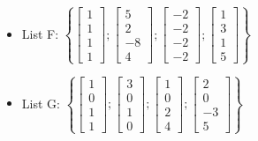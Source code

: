 \begin{itemize}
\item 
List F:
$\left\{\left[ \begin{array}{c} 1 \\ 1 \\ 1 \\ 1  \end{array} \right] ;
\left[ \begin{array}{c} 5 \\ 2 \\ -8 \\ 4  \end{array} \right] ;
\left[ \begin{array}{c} -2 \\ -2 \\ -2 \\ -2 \end{array} \right] ; 
\left[ \begin{array}{c} 1 \\ 3 \\ 1 \\ 5 \end{array} \right] \right\} $




\item
List G:
$\left\{\left[ \begin{array}{c} 1 \\ 0 \\ 1 \\ 1 \end{array} \right] ; 
\left[ \begin{array}{c} 3 \\ 0 \\ 1 \\ 0 \end{array} \right] ;
\left[ \begin{array}{c} 1 \\ 0 \\ 2 \\ 4 \end{array} \right] ;
\left[ \begin{array}{c} 2 \\ 0 \\ -3 \\ 5 \end{array} \right] \right\}
$

\end{itemize}





